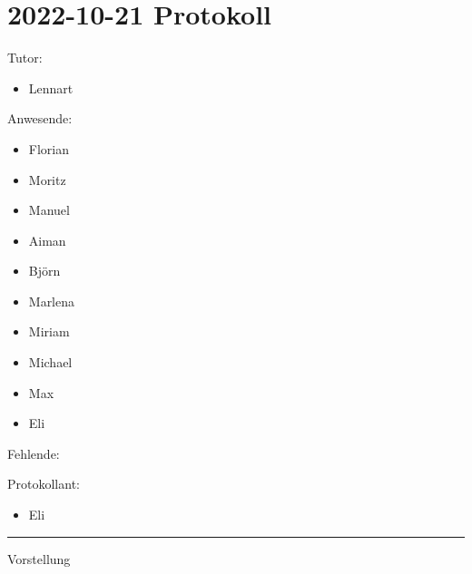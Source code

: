 \hypertarget{protokoll}{%
\section{2022-10-21 Protokoll}\label{protokoll}}

Tutor:

\begin{itemize}
\tightlist
\item
  Lennart
\end{itemize}

Anwesende:

\begin{itemize}
\tightlist
\item
  Florian
\item
  Moritz
\item
  Manuel
\item
  Aiman
\item
  Björn
\item
  Marlena
\item
  Miriam
\item
  Michael
\item
  Max
\item
  Eli
\end{itemize}

Fehlende:

Protokollant:

\begin{itemize}
\tightlist
\item
  Eli
\end{itemize}

\begin{center}\rule{0.5\linewidth}{0.5pt}\end{center}

Vorstellung

